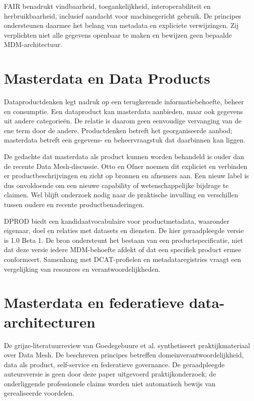 FAIR benadrukt vindbaarheid, toegankelijkheid, interoperabiliteit en herbruikbaarheid, inclusief aandacht voor machinegericht gebruik. De principes ondersteunen daarmee het belang van metadata en expliciete verwijzingen. Zij verplichten niet alle gegevens openbaar te maken en bewijzen geen bepaalde MDM-architectuur. \parencite{L11}

\section{Masterdata en Data Products}
Dataproductdenken legt nadruk op een terugkerende informatiebehoefte, beheer en consumptie. Een dataproduct kan masterdata aanbieden, maar ook gegevens uit andere categorieën. De relatie is daarom geen eenvoudige vervanging van de ene term door de andere. Productdenken betreft het georganiseerde aanbod; masterdata betreft een gegevens- en beheervraagstuk dat daarbinnen kan liggen. \parencite{L12}

De gedachte dat masterdata als product kunnen worden behandeld is ouder dan de recente Data Mesh-discussie. Otto en Ofner noemen dit expliciet en verbinden er productbeschrijvingen en zicht op bronnen en afnemers aan. Een nieuw label is dus onvoldoende om een nieuwe capability of wetenschappelijke bijdrage te claimen. Wel blijft onderzoek nodig naar de praktische invulling en verschillen tussen oudere en recente productbenaderingen. \parencite{L20}

DPROD biedt een kandidaatvocabulaire voor productmetadata, waaronder eigenaar, doel en relaties met datasets en diensten. De hier geraadpleegde versie is 1.0 Beta 1. De bron ondersteunt het bestaan van een productspecificatie, niet dat deze versie iedere MDM-behoefte afdekt of dat een specifiek product ermee conformeert. Samenhang met DCAT-profielen en metadataregistries vraagt een vergelijking van resources en verantwoordelijkheden. \parencite{S51,S47,S08}

\section{Masterdata en federatieve data-architecturen}
De grijze-literatuurreview van Goedegebuure et al. synthetiseert praktijkmateriaal over Data Mesh. De beschreven principes betreffen domeinverantwoordelijkheid, data als product, self-service en federatieve governance. De geraadpleegde auteursversie is geen door deze paper uitgevoerd praktijkonderzoek; de onderliggende professionele claims worden niet automatisch bewijs van gerealiseerde voordelen. \parencite{L23}

